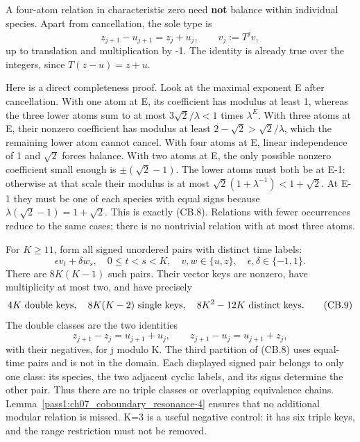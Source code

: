 A four-atom relation in characteristic zero need \textbf{not} balance within individual species. Apart from cancellation, the sole type is \[
 z_{j+1}-u_{j+1}=z_j+u_j,\qquad v_j:=T^jv,                     \tag{CB.8}
\] up to translation and multiplication by -1. The identity is already true over the integers, since \(T(z-u)=z+u\).

Here is a direct completeness proof. Look at the maximal exponent E after cancellation. With one atom at E, its coefficient has modulus at least 1, whereas the three lower atoms sum to at most \(3\sqrt2/\lambda<1\) times \(\lambda^E\). With three atoms at E, their nonzero coefficient has modulus at least \(2-\sqrt2>\sqrt2/\lambda\), which the remaining lower atom cannot cancel. With four atoms at E, linear independence of 1 and \(\sqrt2\) forces balance. With two atoms at E, the only possible nonzero coefficient small enough is \(\pm(\sqrt2-1)\). The lower atoms must both be at E-1: otherwise at that scale their modulus is at most \(\sqrt2(1+\lambda^{-1})<1+\sqrt2\). At E-1 they must be one of each species with equal signs because \(\lambda(\sqrt2-1)=1+\sqrt2\). This is exactly (CB.8). Relations with fewer occurrences reduce to the same cases; there is no nontrivial relation with at most three atoms.

\begin{corollary}\label{pass1:ch07_coboundary_resonance-5} For \(K\geq11\), form all signed unordered pairs with distinct time labels: \[
 \epsilon v_t+\delta w_s,
 \quad 0\leq t<s<K,\quad v,w\in\{u,z\},\quad
 \epsilon,\delta\in\{-1,1\}.
\] There are \(8K(K-1)\) such pairs. Their vector keys are nonzero, have multiplicity at most two, and have precisely \[
 4K\ \hbox{double keys},\quad 8K(K-2)\ \hbox{single keys},
 \quad 8K^2-12K\ \hbox{distinct keys}.                          \tag{CB.9}
\] The double classes are the two identities \[
 z_{j+1}-z_j=u_{j+1}+u_j,\qquad
 z_{j+1}-u_j=u_{j+1}+z_j,
\] with their negatives, for j modulo K. The third partition of (CB.8) uses equal-time pairs and is not in the domain. Each displayed signed pair belongs to only one class: its species, the two adjacent cyclic labels, and its signs determine the other pair. Thus there are no triple classes or overlapping equivalence chains. Lemma~\ref{pass1:ch07_coboundary_resonance-4} ensures that no additional modular relation is missed. K=3 is a useful negative control: it has six triple keys, and the range restriction must not be removed.
\end{corollary}

